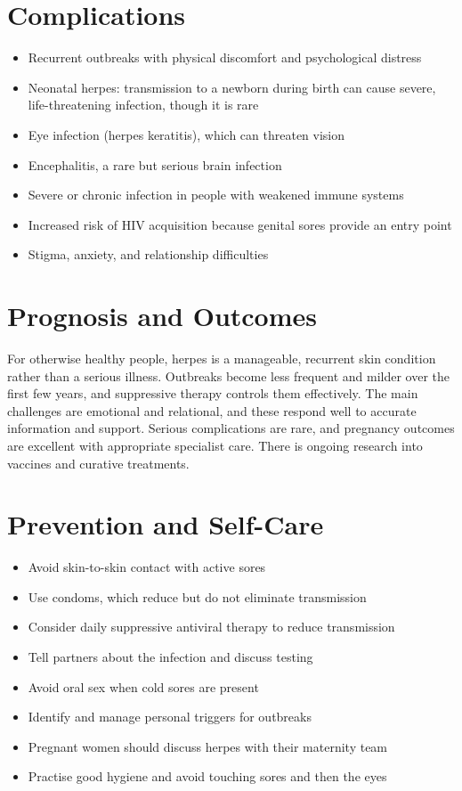 \section*{Complications}
\begin{itemize}
    \item Recurrent outbreaks with physical discomfort and psychological distress
    \item Neonatal herpes: transmission to a newborn during birth can cause severe, life-threatening infection, though it is rare
    \item Eye infection (herpes keratitis), which can threaten vision
    \item Encephalitis, a rare but serious brain infection
    \item Severe or chronic infection in people with weakened immune systems
    \item Increased risk of HIV acquisition because genital sores provide an entry point
    \item Stigma, anxiety, and relationship difficulties
\end{itemize}

\section*{Prognosis and Outcomes}
For otherwise healthy people, herpes is a manageable, recurrent skin condition rather than a serious illness. Outbreaks become less frequent and milder over the first few years, and suppressive therapy controls them effectively. The main challenges are emotional and relational, and these respond well to accurate information and support. Serious complications are rare, and pregnancy outcomes are excellent with appropriate specialist care. There is ongoing research into vaccines and curative treatments.

\section*{Prevention and Self-Care}
\begin{itemize}
    \item Avoid skin-to-skin contact with active sores
    \item Use condoms, which reduce but do not eliminate transmission
    \item Consider daily suppressive antiviral therapy to reduce transmission
    \item Tell partners about the infection and discuss testing
    \item Avoid oral sex when cold sores are present
    \item Identify and manage personal triggers for outbreaks
    \item Pregnant women should discuss herpes with their maternity team
    \item Practise good hygiene and avoid touching sores and then the eyes
\end{itemize}

